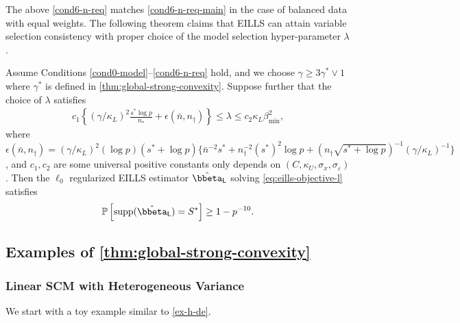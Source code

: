 \documentclass[10pt]{article}
\numberwithin{equation}{section}
\newcommand*{\supp}{\mathrm{supp}}
\begin{document}
The above \cref{cond6-n-req} matches \cref{cond6-n-req-main} in the case of balanced data with equal weights. The following theorem claims that EILLS can attain variable selection consistency with proper choice of the model selection hyper-parameter $\lambda$.

\begin{theorem}	
\label{thm:high-dim}  Assume Conditions \ref{cond0-model}--\ref{cond6-n-req} hold, and we choose $\gamma \ge 3\gamma^* \lor 1$ where $\gamma^*$ is defined in \cref{thm:global-strong-convexity}. Suppose further that the choice of $\lambda$ satisfies
\begin{align}
    c_1 \left\{ (\gamma/\kappa_L)^2 \frac{s^*\log p}{n_*} + \epsilon(\bar{n}, n_\dagger)\right\} \le \lambda \le c_2 \kappa_L \beta_{\min}^2,
\end{align} where $\epsilon(\bar{n}, n_\dagger) = (\gamma/\kappa_L)^2 (\log p) (s^* + \log p) \{\bar{n}^{-2}s^* + n_\dagger^{-2} (s^*)^2\log p + (n_\dagger \sqrt{s^* + \log p})^{-1}(\gamma/\kappa_L)^{-1} \}$, and  $c_1, c_2$ are some universal positive constants only depends on $(C,\kappa_U, \sigma_x,\sigma_\varepsilon)$. Then the $\ell_0$ regularized EILLS estimator $\hat{\bbeta}_{\mathsf{L}}$ solving \eqref{eq:eills-objective-l} satisfies 
\begin{align*}
    \mathbb{P}\left[\supp(\hat{\bbeta}_{\mathsf{L}}) = S^*\right] \ge 1-p^{-10}.
\end{align*}
\end{theorem}


\subsection{Examples of \cref{thm:global-strong-convexity}}

\label{sec:moreex}

\subsubsection{Linear SCM with Heterogeneous Variance}

We start with a toy example similar to \cref{ex-h-de}.
\end{document}

